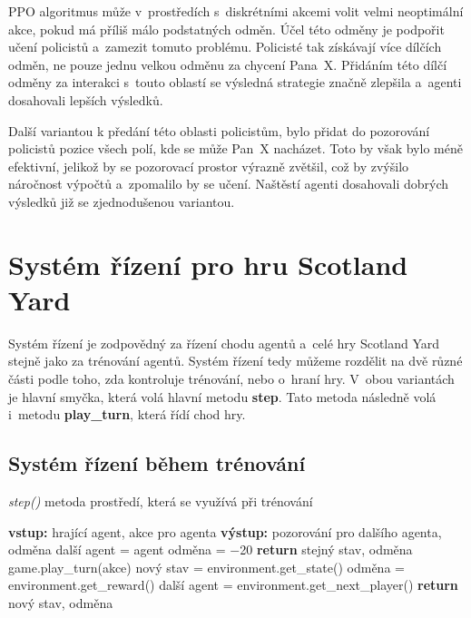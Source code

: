 PPO algoritmus může v~prostředích s~diskrétními akcemi volit velmi neoptimální akce, pokud má příliš málo podstatných odměn\cite{PPO_weakness}.
Účel této odměny je podpořit učení policistů a~zamezit tomuto problému.
Policisté tak získávají více dílčích odměn, ne pouze jednu velkou odměnu za chycení Pana~X\@.
Přidáním této dílčí odměny za interakci s~touto oblastí se výsledná strategie značně zlepšila a~agenti dosahovali lepších výsledků.

Další variantou k předání této oblasti policistům, bylo přidat do pozorování policistů pozice všech polí, kde se může Pan~X nacházet.
Toto by však bylo méně efektivní, jelikož by se pozorovací prostor výrazně zvětšil, což by zvýšilo náročnost výpočtů a~zpomalilo by se učení.
Naštěstí agenti dosahovali dobrých výsledků již se zjednodušenou variantou.

\section{Systém řízení pro hru Scotland Yard}
\label{sec:system_rizeni}
Systém řízení je zodpovědný za řízení chodu agentů a~celé hry Scotland Yard stejně jako za trénování agentů.
Systém řízení tedy můžeme rozdělit na dvě různé části podle toho, zda kontroluje trénování, nebo o~hraní hry.
V~obou variantách je hlavní smyčka, která volá hlavní metodu \textbf{step}.
Tato metoda následně volá i~metodu \textbf{play\_turn}, která řídí chod hry.

\subsection{Systém řízení během trénování}

\begin{algorithm}[H]
  \caption{\emph{step()} metoda prostředí, která se využívá při trénování}
  \label{alg:step}
  \begin{algorithmic}
    \State \textbf{vstup:} hrající agent, akce pro agenta
    \State \textbf{výstup:} pozorování pro dalšího agenta, odměna
    \State
    \State další agent = agent
    \State odměna = $\minus$20
    \State \textbf{return} stejný stav, odměna
    \EndIf
    \State game.play\_turn(akce)
    \State nový stav = environment.get\_state()
    \State odměna = environment.get\_reward()
    \State další agent = environment.get\_next\_player()
    \State \textbf{return} nový stav, odměna
  \end{algorithmic}
\end{algorithm}

